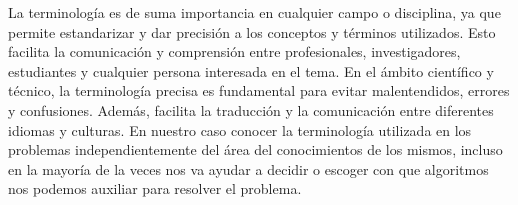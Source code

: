 La terminología es de suma importancia en cualquier campo o disciplina, ya que permite estandarizar y dar precisión a los conceptos y términos utilizados. Esto facilita la comunicación y comprensión entre profesionales, investigadores, estudiantes y cualquier persona interesada en el tema. En el ámbito científico y técnico, la terminología precisa es fundamental para evitar malentendidos, errores y confusiones. Además, facilita la traducción y la comunicación entre diferentes idiomas y culturas. En nuestro caso conocer la terminología utilizada en los problemas independientemente del área del conocimientos de los mismos, incluso en la mayoría de la veces nos va ayudar a decidir o escoger con que algoritmos nos podemos auxiliar para resolver el problema.


